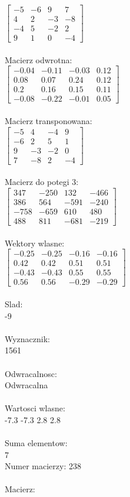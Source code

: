 \documentclass[a4paper,12pt]{article}
\begin{document}
$\begin{bmatrix} -5&-6&9&7\\4&2&-3&-8\\-4&5&-2&2\\9&1&0&-4 \end{bmatrix}$
\\
\\
Macierz odwrotna:\\

$\begin{bmatrix} -0.04&-0.11&-0.03&0.12\\0.08&0.07&0.24&0.12\\0.2&0.16&0.15&0.11\\-0.08&-0.22&-0.01&0.05 \end{bmatrix}$
\\
\\
Macierz transponowana:\\

$\begin{bmatrix} -5&4&-4&9\\-6&2&5&1\\9&-3&-2&0\\7&-8&2&-4 \end{bmatrix}$
\\
\\
Macierz do potegi 3:\\

$\begin{bmatrix} 347&-250&132&-466\\386&564&-591&-240\\-758&-659&610&480\\488&811&-681&-219 \end{bmatrix}$
\\
\\
Wektory wlasne:\\

$\begin{bmatrix} -0.25&-0.25&-0.16&-0.16\\0.42&0.42&0.51&0.51\\-0.43&-0.43&0.55&0.55\\0.56&0.56&-0.29&-0.29 \end{bmatrix}$
\\
\\
Slad:\\
-9
\\
\\
Wyznacznik:\\
1561
\\
\\
Odwracalnosc:\\
Odwracalna
\\
\\
Wartosci wlasne:\\
-7.3 -7.3 2.8 2.8
\\
\\
Suma elementow:\\
7
\\
\newpage
Numer macierzy:
238
\\
\\
Macierz:\\
\end{document}
